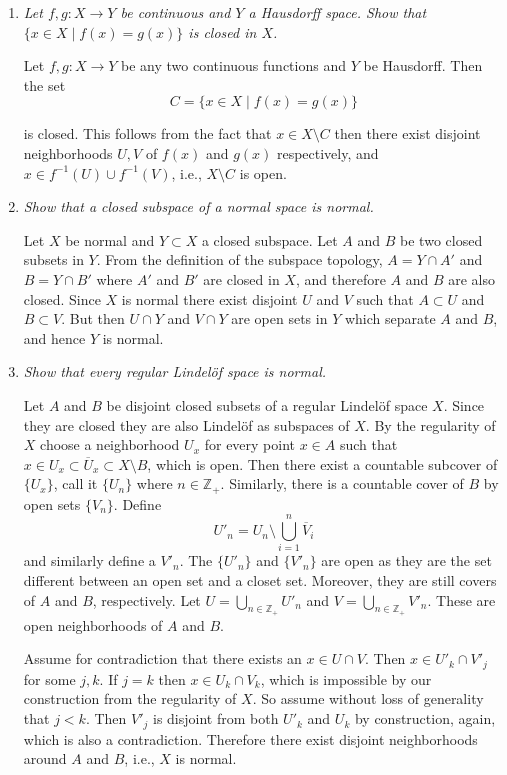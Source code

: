 \documentclass[10pt]{article}
\newcommand{\Z}{\mathbb{Z}}
\begin{document}
\begin{enumerate}
\item \emph{Let $f,g: X \rightarrow Y$ be continuous and $Y$ a Hausdorff space.  Show that $\{x \in X \mid f(x) = g(x)\}$ is closed in $X$.}

Let $f,g: X \rightarrow Y$ be any two continuous functions and $Y$ be Hausdorff.  Then the set
\[
C = \{x \in X \mid f(x) = g(x)\}
\]

is closed.  This follows from the fact that $x \in X \setminus C$ then there exist disjoint neighborhoods $U, V$ of $f(x)$ and $g(x)$ respectively, and $x \in f^{-1}(U) \cup f^{-1}(V)$, i.e., $X \setminus C$ is open.

\item \emph{Show that a closed subspace of a normal space is normal.}

Let $X$ be normal and $Y \subset X$ a closed subspace.  Let $A$ and $B$ be two closed subsets in $Y$.  From the definition of the subspace topology, $A = Y \cap A'$ and $B = Y \cap B'$ where $A'$ and $B'$ are closed in $X$, and therefore $A$ and $B$ are also closed.  Since $X$ is normal there exist disjoint $U$ and $V$ such that $A \subset U$ and $B \subset V$.  But then $U \cap Y$ and $V \cap Y$ are open sets in $Y$ which separate $A$ and $B$, and hence $Y$ is normal.

\item \emph{Show that every regular Lindel\"{o}f space is normal.}

Let $A$ and $B$ be disjoint closed subsets of a regular Lindel\"{o}f space $X$.  Since they are closed they are also Lindel\"{o}f as subspaces of $X$.  By the regularity of $X$ choose a neighborhood $U_x$ for every point $x \in A$ such that $x \in U_x \subset \overline{U}_x \subset X \setminus B$, which is open.  Then there exist a countable subcover of $\{U_x\}$, call it $\{U_n\}$ where $n \in \Z_+$.  Similarly, there is a countable cover of $B$ by open sets $\{V_n\}$.  Define $$U'_n = U_n \setminus \bigcup_{i=1}^n \overline{V}_i$$ and similarly define a $V'_n$.  The $\{U'_n\}$ and $\{V'_n\}$ are open as they are the set different between an open set and a closet set.  Moreover, they are still covers of $A$ and $B$, respectively.  Let $U = \bigcup_{n \in \Z_+} U'_n$ and $V = \bigcup_{n \in \Z_+} V'_n$.  These are open neighborhoods of $A$ and $B$.

Assume for contradiction that there exists an $x \in U \cap V$.  Then $x \in U'_k \cap V'_j$ for some $j,k$.  If $j = k$ then $x \in U_k \cap V_k$, which is impossible by our construction from the regularity of $X$.  So assume without loss of generality that $j < k$.  Then $V'_j$ is disjoint from both $U'_k$ and $U_k$ by construction, again, which is also a contradiction.  Therefore there exist disjoint neighborhoods around $A$ and $B$, i.e., $X$ is normal.


\end{enumerate}
\end{document}
